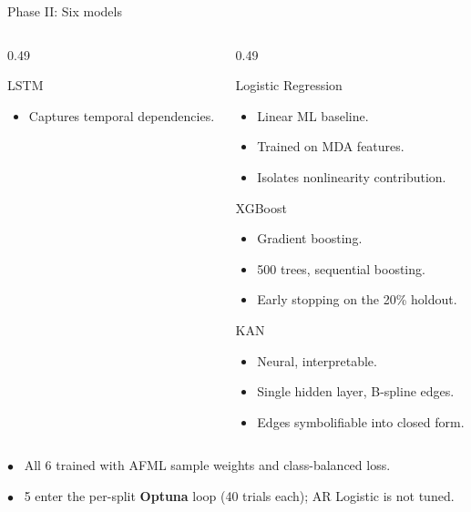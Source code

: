 \documentclass[aspectratio=169, t]{beamer}
\begin{document}
\begin{frame}{Phase II: Six models}
\begin{columns}[T]
\begin{column}{0.49\textwidth}
{\begin{block}{LSTM}
\begin{itemize}
  \item Captures temporal dependencies.
\end{itemize}
\end{block}
}
\end{column}
\begin{column}{0.49\textwidth}
{
\begin{block}{Logistic Regression}
\scriptsize
\begin{itemize}\setlength{\itemsep}{0pt}
  \item Linear ML baseline.
  \item Trained on MDA features.
  \item Isolates nonlinearity contribution.
\end{itemize}
\end{block}
}
\vspace{-0.5em}
{
\begin{block}{XGBoost}
\scriptsize
\begin{itemize}\setlength{\itemsep}{0pt}
  \item Gradient boosting.
  \item 500 trees, sequential boosting.
  \item Early stopping on the 20\% holdout.
\end{itemize}
\end{block}
}
\vspace{-0.5em}
{
\begin{block}{KAN}
\scriptsize
\begin{itemize}\setlength{\itemsep}{0pt}
  \item Neural, interpretable.
  \item Single hidden layer, B-spline edges.
  \item Edges symbolifiable into closed form.
\end{itemize}
\end{block}
}
\end{column}
\end{columns}

\vspace{1.0em}

{\scriptsize\textcolor{isegred}{$\bullet$}~ All 6 trained with AFML sample weights and class-balanced loss.}

{\scriptsize\textcolor{isegred}{$\bullet$}~ 5 enter the per-split \textbf{Optuna} loop (40 trials each); AR Logistic is not tuned.}

\end{frame}
\end{document}
